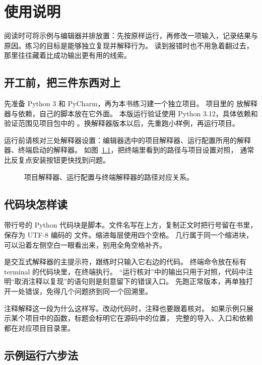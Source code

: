 \chapter{使用说明}

阅读时可将示例与编辑器并排放置：先按原样运行，再修改一项输入，记录结果与原因。练习的目标是能够独立复现并解释行为。
读到报错时也不用急着翻过去，那里往往藏着比成功输出更有用的线索。

\section*{开工前，把三件东西对上}

先准备 Python 3 和 PyCharm，再为本书练习建一个独立项目。
项目里的  放解释器与依赖，自己的脚本放在它外面。
本版运行验证使用 Python 3.12，具体依赖和验证范围见项目包中的
。换解释器版本以后，先重跑小样例，再运行项目。

运行前请核对三处解释器设置：编辑器选中的项目解释器、运行配置所用的解释器、终端启动的解释器。
如图~\ref{fig:usage-interpreter}，把终端里看到的路径与项目设置对照，
通常比反复点安装按钮更快找到问题。
\begin{figure}[htbp]
  \centering
  \caption{项目解释器、运行配置与终端解释器的路径对应关系。}
  \label{fig:usage-interpreter}
\end{figure}

\section*{代码块怎样读}

带行号的 Python 代码块是脚本。文件名写在上方，复制正文时把行号留在书里，
保存为 UTF-8 编码的  文件。缩进每层使用四个空格。
几行属于同一个缩进块，可以沿着左侧空白一眼看出来，别用全角空格补齐。

\code{>>>} 是交互式解释器的主提示符，跟练时只输入它右边的代码。
终端命令放在标有 terminal 的代码块里，在终端执行。
“运行核对”中的输出只用于对照，代码中注明“取消注释以复现”的语句则是刻意留下的错误入口。
先跑正常版本，再单独打开一处错误，免得几个问题挤到同一个回溯里。

注释解释这一段为什么这样写。改动代码时，注释也要跟着核对。
如果示例只展示某个项目中的函数，标题会标明它在源码中的位置，
完整的导入、入口和依赖都在对应项目目录里。

\section*{示例运行六步法}

